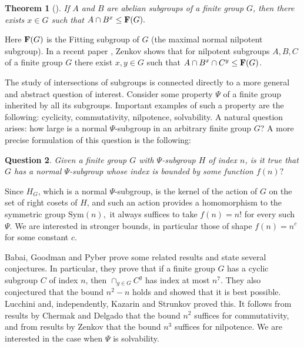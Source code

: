 \documentclass[a4paper,reqno,11pt]{amsart}
\newtheorem{Th}{Theorem}[section]
\newtheorem{Que}[Th]{Question}
\theoremstyle{definition}
\theoremstyle{remark}
\numberwithin{equation}{section}
\newcommand{\Sym}{\mathrm{Sym}}
\begin{document}
\begin{Th}[\cite{zen}]
\label{zenab}
If $A$ and $B$ are abelian subgroups of a finite group $G$, then there exists $x \in G$ such that $A \cap B^x \le {\bf F}(G).$
\end{Th}
Here ${\bf F}(G)$ is the Fitting subgroup of $G$ (the maximal normal nilpotent subgroup).
In a recent paper \cite{zen21}, Zenkov shows that for nilpotent subgroups $A,B,C$ of a finite group $G$ there exist $x,y \in G$ such that $A \cap B^x \cap C^y \le {\bf F}(G)$.



The study of intersections of subgroups is connected directly to a more general and abstract question of interest. Consider some property $\Psi$ of a finite group inherited by all its subgroups.  Important examples of  such a property are  the following: cyclicity, commutativity, nilpotence, solvability.
A natural question arises: how large is a normal $\Psi$-subgroup in an arbitrary finite group $G$? A more precise formulation of this question is the following:

\begin{Que}\label{que1}
Given a finite group $G$ with $\Psi$-subgroup $H$ of index $n$, is it true that $G$ has a normal $\Psi$-subgroup whose index is bounded by some function $f(n)?$
\end{Que}

Since $H_G$, which is a normal $\Psi$-subgroup, is the kernel of the action of $G$ on the set of right cosets of $H$, and such an action provides a homomorphism to the symmetric group $\Sym(n),$   it always suffices to take $f(n)=n!$ for every such $\Psi$. We are interested in  stronger bounds, in particular those of shape $f(n)=n^c$ for some constant $c.$



Babai, Goodman and Pyber \cite{bab} prove some related results and state several conjectures.
In particular, they prove that
if a finite group $G$ has a cyclic subgroup ${C}$ of index $n$, then $ \cap_{g \in G} {{C}}^g$ has index at most $n^7.$
They also conjectured that the bound $n^2-n$ holds  and showed that it is best possible. Lucchini \cite{luccini} and, independently,  Kazarin and  Strunkov \cite{kaz} proved this. It follows from 
results  by Chermak and  Delgado \cite{cher} that the bound $n^2$ suffices for commutativity, and from results  by Zenkov \cite{zen21} that the bound $n^3$ suffices for nilpotence. We are interested in the case when $\Psi$ is solvability.
\end{document}
